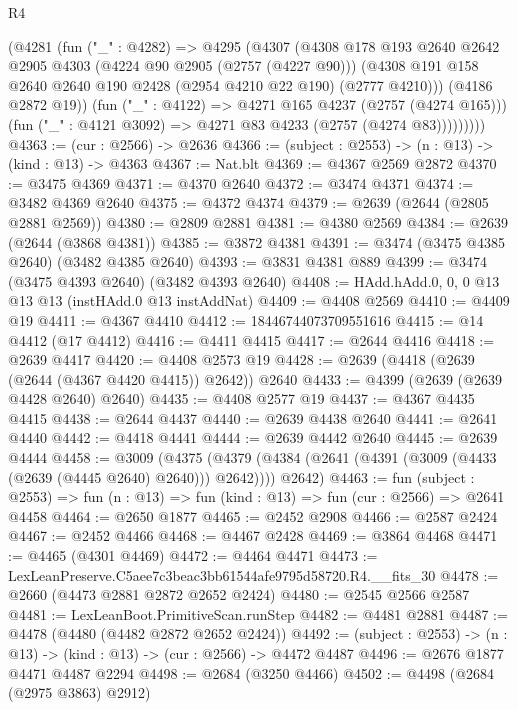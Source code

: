 \begin{lexlean}{R4}
\begin{coremodule}
            (@4281
              (fun ("_" : @4282) =>
              @4295
                (@4307
                  (@4308
                    @178
                    @193
                    @2640
                    @2642
                    @2905
                    @4303
                    (@4224 @90 @2905 (@2757 (@4227 @90)))
                    (@4308 @191 @158 @2640 @2640 @190 @2428 (@2954 @4210 @22 @190) (@2777 @4210)))
                  (@4186 @2872 @19))
                (fun ("_" : @4122) => @4271 @165 @4237 (@2757 (@4274 @165)))
                (fun ("_" : @4121 @3092) => @4271 @83 @4233 (@2757 (@4274 @83)))))))))
@4363 := (cur : @2566) -> @2636
@4366 := (subject : @2553) -> (n : @13) -> (kind : @13) -> @4363
@4367 := Nat.blt
@4369 := @4367 @2569 @2872
@4370 := @3475 @4369
@4371 := @4370 @2640
@4372 := @3474 @4371
@4374 := @3482 @4369 @2640
@4375 := @4372 @4374
@4379 := @2639 (@2644 (@2805 @2881 @2569))
@4380 := @2809 @2881
@4381 := @4380 @2569
@4384 := @2639 (@2644 (@3868 @4381))
@4385 := @3872 @4381
@4391 := @3474 (@3475 @4385 @2640) (@3482 @4385 @2640)
@4393 := @3831 @4381 @889
@4399 := @3474 (@3475 @4393 @2640) (@3482 @4393 @2640)
@4408 := HAdd.hAdd.{0, 0, 0} @13 @13 @13 (instHAdd.{0} @13 instAddNat)
@4409 := @4408 @2569
@4410 := @4409 @19
@4411 := @4367 @4410
@4412 := 18446744073709551616
@4415 := @14 @4412 (@17 @4412)
@4416 := @4411 @4415
@4417 := @2644 @4416
@4418 := @2639 @4417
@4420 := @4408 @2573 @19
@4428 := @2639 (@4418 (@2639 (@2644 (@4367 @4420 @4415)) @2642)) @2640
@4433 := @4399 (@2639 (@2639 @4428 @2640) @2640)
@4435 := @4408 @2577 @19
@4437 := @4367 @4435 @4415
@4438 := @2644 @4437
@4440 := @2639 @4438 @2640
@4441 := @2641 @4440
@4442 := @4418 @4441
@4444 := @2639 @4442 @2640
@4445 := @2639 @4444
@4458 := @3009
    (@4375 (@4379 (@4384 (@2641 (@4391 (@3009 (@4433 (@2639 (@4445 @2640) @2640))) @2642)))) @2642)
@4463 := fun (subject : @2553) =>
  fun (n : @13) => fun (kind : @13) => fun (cur : @2566) => @2641 @4458
@4464 := @2650 @1877
@4465 := @2452 @2908
@4466 := @2587 @2424
@4467 := @2452 @4466
@4468 := @4467 @2428
@4469 := @3864 @4468
@4471 := @4465 (@4301 @4469)
@4472 := @4464 @4471
@4473 := LexLeanPreserve.C5aee7c3beac3bb61544afe9795d58720.R4.__fits_30
@4478 := @2660 (@4473 @2881 @2872 @2652 @2424)
@4480 := @2545 @2566 @2587
@4481 := LexLeanBoot.PrimitiveScan.runStep
@4482 := @4481 @2881
@4487 := @4478 (@4480 (@4482 @2872 @2652 @2424))
@4492 := (subject : @2553) -> (n : @13) -> (kind : @13) -> (cur : @2566) -> @4472 @4487
@4496 := @2676 @1877 @4471 @4487 @2294
@4498 := @2684 (@3250 @4466)
@4502 := @4498 (@2684 (@2975 @3863) @2912)

\end{coremodule}
\end{lexlean}
